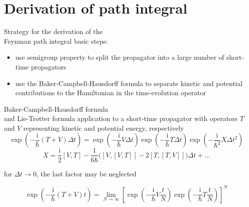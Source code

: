 \documentclass[t,dvipsnames]{beamer}
\begin{document}
\section{Derivation of path integral}

\begin{frame}[c]{}
 \begin{center}
  \begin{minipage}{0.8\textwidth}
   \tableofcontents[currentsection]
  \end{minipage}
 \end{center}
\end{frame}

\begin{frame}[c]{Strategy for the derivation of the\\
	         Feynman path integral}
 basic steps:
 \begin{itemize}
  \item use semigroup property to split the propagator into
	a large number of short-time propagators
  \item use the Baker-Campbell-Hausdorff formula to separate
	kinetic and potential contributions to the Hamiltonian
        in the time-evolution operator
 \end{itemize}
\end{frame}

\begin{frame}[c]{Baker-Campbell-Hausdorff formula\\
	         and Lie-Trotter formula}
 application to a short-time propagator with operators $T$ and
 $V$ representing kinetic and potential energy, respectively
 \begin{displaymath}
   \exp\left(-\frac{\text{i}}{\hbar}(T+V)\Delta t\right)
	  = \exp\left(-\frac{\text{i}}{\hbar}V\Delta t\right)
	     \exp\left(-\frac{\text{i}}{\hbar}T\Delta t\right)
	     \exp\left(-\frac{\text{i}}{\hbar^2}X\Delta t^2\right)
 \end{displaymath}
 \begin{displaymath}
  X = \frac{\text{i}}{2}[V,T]
      -\frac{1}{6\hbar}\bigg([V,[V,T]]-2[T,[T,V]]\bigg)\Delta t+\ldots
 \end{displaymath}

 \vspace{0.3truecm}
 for $\Delta t\to 0$, the last factor may be neglected

 \begin{displaymath}
  \exp\left(-\frac{\text{i}}{\hbar}(T+V)t\right) =
    \lim_{N\to\infty}\left[\exp\left(-\frac{\text{i}}{\hbar}V\frac{t}{N}\right)
      \exp\left(-\frac{\text{i}}{\hbar}T\frac{t}{N}\right)\right]^N
 \end{displaymath}
\end{frame}
\end{document}
